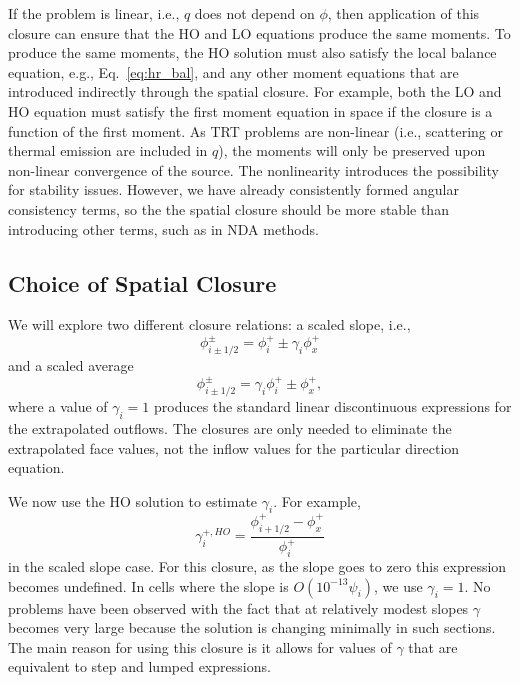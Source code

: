 If the problem is linear, i.e., $q$ does not depend on $\phi$, then application of this
closure can ensure that the HO and LO equations produce the same moments.  To produce the
same moments, the HO solution must also satisfy the local balance equation, e.g.,
Eq.~\eqref{eq:hr_bal}, and any other moment equations that are introduced indirectly
through the spatial closure.  For example, both the LO and HO equation must satisfy the
first moment equation in space if the closure is a function of the first moment.  
As TRT problems are non-linear (i.e., scattering or thermal emission are included in
$q$), the moments will only be preserved upon non-linear convergence of the source.  The
nonlinearity introduces the possibility for stability
issues.  However, we have already consistently formed angular consistency terms, so the
the spatial closure should be more stable than introducing other terms, such as
in NDA methods. 



\subsection{Choice of Spatial Closure}
\label{sec:spat_clos_options}

We will
explore two different closure relations: a scaled slope, i.e.,
\begin{equation}
    \phi_{i\pm1/2}^\pm = \phi_i^+ \pm \gamma_i \phi_x^+
\end{equation}
and a scaled average
\begin{equation}
    \phi_{i\pm1/2}^\pm = \gamma_i \phi_i^+ \pm \phi_x^+,
\end{equation}
where a value of $\gamma_i = 1$ produces the standard linear discontinuous expressions for
the extrapolated outflows.  The 
closures are only needed to eliminate the extrapolated face values, not the inflow values
for the particular direction equation.

We now use the HO solution to estimate $\gamma_i$.  For example, 
\begin{equation}
    \gamma_i^{+,HO} = \frac{\phi_{i+1/2}^+ - \phi_x^+}{\phi_i^+}
\end{equation}
in the scaled slope case.  For this closure, as the slope goes to zero this expression
becomes undefined.  In cells where the slope is $O(10^{-13} \psi_i)$, we use $\gamma_i=1$.
No problems have been observed with the fact that at relatively modest slopes $\gamma$
becomes very large because the solution is changing minimally in such sections. 
The main reason for using this closure is it allows for values of $\gamma$ that are
equivalent to step and lumped expressions.

